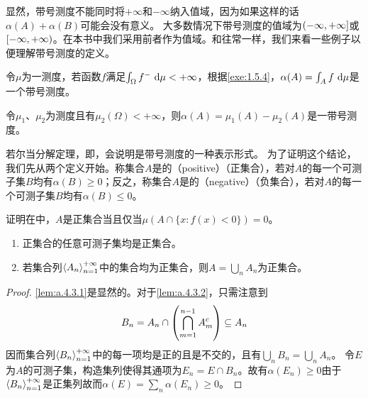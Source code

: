 \documentclass[main.tex]{subfiles}
\begin{document}
显然，带号测度不能同时将\(+\infty\)和\(-\infty\)纳入值域，因为如果这样的话\(\alpha(A)+\alpha(B)\)可能会没有意义。
大多数情况下带号测度的值域为\(\intoc{-\infty, +\infty}\)或\(\intco{-\infty, +\infty}\)。在本书中我们采用前者作为值域。和往常一样，我们来看一些例子以便理解带号测度的定义。
\begin{example} \label{ex:a.4.1}
	令\(\mu\)为一测度，若函数\(f\)满足\(\int_\Omega f^-\,\dif \mu < +\infty\)，根据\ref{exe:1.5.4}，\(\alpha(A) = \int_A f\,\dif\mu\)是一个带号测度。%
\end{example}
\begin{example} \label{ex:a.4.2}
	令\(\mu_1\)、\(\mu_2\)为测度且有\(\mu_2(\Omega)<+\infty\)，则\(\alpha(A)=\mu_1(A) - \mu_2(A)\)是一带号测度。
\end{example}

若尔当分解定理，即，会说明是带号测度的一种表示形式。
为了证明这个结论，我们先从两个定义开始。称集合\(A\)是的（positive）（正集合），若对\(A\)的每一个可测子集\(B\)均有\(\alpha(B)\geq 0\)；反之，称集合\(A\)是的（negative）（负集合），若对\(A\)的每一个可测子集\(B\)均有\(\alpha(B)\leq 0\)。
\begin{exercise}
	\item 证明在中，\(A\)是正集合当且仅当\(\mu(A\cap \{x:f(x)< 0\}) = 0\)。
\end{exercise}
\begin{lemma} \label{lem:a.4.3}
	\begin{enumerate}
		\item \label{lem:a.4.3.1} 正集合的任意可测子集均是正集合。
		\item \label{lem:a.4.3.2} 若集合列\(\left<A_n\right>^{+\infty}_{n=1}\)中的集合均为正集合，则\(A=\bigcup_n A_n\)为正集合。
	\end{enumerate}
\end{lemma}
\begin{proof}
	\ref{lem:a.4.3.1}是显然的。对于\ref{lem:a.4.3.2}，只需注意到
	\[B_n = A_n\cap\del{\bigcap_{m=1}^{n-1}A_m^c} \subseteq A_n\]
	因而集合列\(\left<B_n\right>^{+\infty}_{n=1}\)中的每一项均是正的且是不交的，且有\(\bigcup_n B_n = \bigcup_n A_n\)。
	令\(E\)为\(A\)的可测子集，构造集列使得其通项为\(E_n = E\cap B_n\)。故有\(\alpha(E_n)\geq 0\)由于\(\left<B_n\right>^{+\infty}_{n=1}\)是正集列故而\(\alpha(E) = \sum_n \alpha(E_n) \geq 0\)。
\end{proof}
\end{document}
